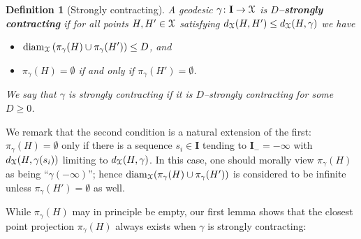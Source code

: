 \documentclass[letterpaper,fleqn]{article}
\theoremstyle{plain}
\newtheorem{definition}[theorem]{Definition}
\theoremstyle{definition}
\newcommand{\define}[1]{\textbf{#1}}
\DeclareMathOperator{\diam}{diam}
\newcommand{\os}{{\EuScript X}} %
\newcommand{\cp}{\pi} %
\renewcommand{\diam}{\mathrm{diam}}
\newcommand{\I}{\mathbf{I}}
\newcommand{\Imin}{\I_-}
\begin{document}
\begin{definition}[Strongly contracting]
\label{def:strongly-contracting}
A geodesic $\gamma\colon \I\to \os$ is \define{$D$--strongly contracting} if for all points $H,H'\in\os$ satisfying  $d_\os(H,H') \le d_\os(H,\gamma)$ we have
\begin{itemize}
\item $\displaystyle \diam_{\os} \left(\cp_\gamma(H) \cup \cp_\gamma(H')\right) \le D$, and 
\item $\cp_\gamma(H) = \emptyset$ if and only if $\cp_\gamma(H') = \emptyset$.
\end{itemize}
We say that $\gamma$ is strongly contracting if it is $D$--strongly contracting for some $D\ge 0$.
\end{definition}

We remark that the second condition is a natural extension of the first:  $\cp_\gamma(H) = \emptyset$ only if there is a sequence $s_i\in \I$ tending to $\Imin=-\infty$ with $d_\os(H,\gamma(s_i))$ limiting to $d_\os(H,\gamma)$. In this case, one should morally view $\cp_\gamma(H)$ as being ``$\gamma(-\infty)$''; hence $\diam_\os(\cp_\gamma(H)\cup\cp_\gamma(H'))$ is considered to be infinite unless $\cp_\gamma(H') = \emptyset$ as well.


While $\cp_\gamma(H)$ may in principle be empty, our first lemma shows that the closest point projection $\cp_\gamma(H)$ always exists when $\gamma$ is strongly contracting:
\end{document}
